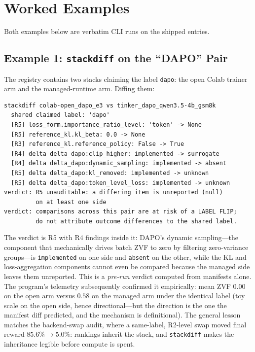 \section{Worked Examples}
\label{sec:p6-worked}
Both examples below are verbatim CLI runs on the shipped entries.

\subsection{Example 1: \texttt{stackdiff} on the ``DAPO'' Pair}
\label{sec:p6-worked-dapo}
The registry contains two stacks claiming the label \texttt{dapo}: the open
Colab trainer arm and the managed-runtime arm. Diffing them:

\begin{lstlisting}[basicstyle=\ttfamily\scriptsize, frame=single,
  caption={\texttt{stackdiff colab-open_dapo_e3
  tinker_dapo_qwen3.5-4b_gsm8k} (abridged: R2 backend lines omitted).},
  label={lst:p6-stackdiff}]
stackdiff colab-open_dapo_e3 vs tinker_dapo_qwen3.5-4b_gsm8k
  shared claimed label: 'dapo'
  [R5] loss_form.importance_ratio_level: 'token' -> None
  [R5] reference_kl.kl_beta: 0.0 -> None
  [R3] reference_kl.reference_policy: False -> True
  [R4] delta delta_dapo:clip_higher: implemented -> surrogate
  [R4] delta delta_dapo:dynamic_sampling: implemented -> absent
  [R5] delta delta_dapo:kl_removed: implemented -> unknown
  [R5] delta delta_dapo:token_level_loss: implemented -> unknown
verdict: R5 unauditable: a differing item is unreported (null)
         on at least one side
verdict: comparisons across this pair are at risk of a LABEL FLIP;
         do not attribute outcome differences to the shared label.
\end{lstlisting}

The verdict is R5 with R4 findings inside it: DAPO's dynamic sampling---the
component that mechanically drives batch ZVF to zero by filtering
zero-variance groups---is \texttt{implemented} on one side and \texttt{absent}
on the other, while the KL and loss-aggregation components cannot even be
compared because the managed side leaves them unreported. This is a
\emph{pre-run} verdict computed from manifests alone. The program's telemetry
subsequently confirmed it empirically: mean ZVF $0.00$ on the open arm versus
$0.58$ on the managed arm under the identical label (toy scale on the open
side, hence directional---but the direction is the one the manifest diff
predicted, and the mechanism is definitional). The general lesson matches the
backend-swap audit, where a same-label, R2-level swap moved final reward
$85.6\% \to 5.0\%$: rankings inherit the stack, and \texttt{stackdiff} makes
the inheritance legible before compute is spent.


